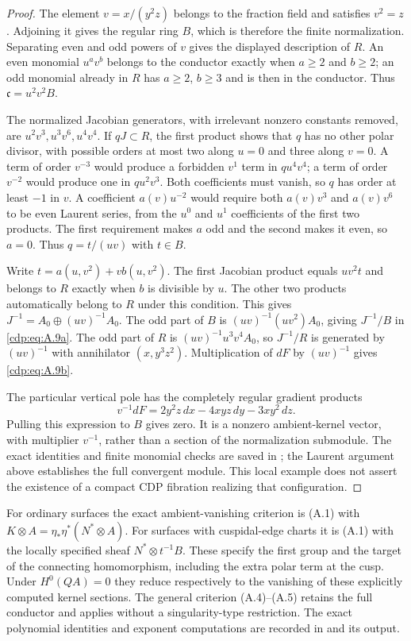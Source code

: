 \begin{proof}
The element $v=x/(y^2z)$ belongs to the fraction field and satisfies $v^2=z$. Adjoining it gives the regular ring $B$, which is therefore the finite normalization. Separating even and odd powers of $v$ gives the displayed description of $R$. An even monomial $u^av^b$ belongs to the conductor exactly when $a\ge2$ and $b\ge2$; an odd monomial already in $R$ has $a\ge2$, $b\ge3$ and is then in the conductor. Thus $\mathfrak c=u^2v^2B$.

The normalized Jacobian generators, with irrelevant nonzero constants removed, are $u^2v^3,u^3v^6,u^4v^4$. If $qJ\subset R$, the first product shows that $q$ has no other polar divisor, with possible orders at most two along $u=0$ and three along $v=0$. A term of order $v^{-3}$ would produce a forbidden $v^1$ term in $qu^4v^4$; a term of order $v^{-2}$ would produce one in $qu^2v^3$. Both coefficients must vanish, so $q$ has order at least $-1$ in $v$. A coefficient $a(v)u^{-2}$ would require both $a(v)v^3$ and $a(v)v^6$ to be even Laurent series, from the $u^0$ and $u^1$ coefficients of the first two products. The first requirement makes $a$ odd and the second makes it even, so $a=0$. Thus $q=t/(uv)$ with $t\in B$.

Write $t=a(u,v^2)+v b(u,v^2)$. The first Jacobian product equals $uv^2t$ and belongs to $R$ exactly when $b$ is divisible by $u$. The other two products automatically belong to $R$ under this condition. This gives $J^{-1}=A_0\oplus(uv)^{-1}A_0$. The odd part of $B$ is $(uv)^{-1}(uv^2)A_0$, giving $J^{-1}/B$ in \eqref{cdp:eq:A.9a}. The odd part of $R$ is $(uv)^{-1}u^3v^4A_0$, so $J^{-1}/R$ is generated by $(uv)^{-1}$ with annihilator $(x,y^3z^2)$. Multiplication of $dF$ by $(uv)^{-1}$ gives \eqref{cdp:eq:A.9b}.

The particular vertical pole has the completely regular gradient products
\[
 v^{-1}dF=2y^2z\,dx-4xyz\,dy-3xy^2\,dz.
\]
Pulling this expression to $B$ gives zero. It is a nonzero ambient-kernel vector, with multiplier $v^{-1}$, rather than a section of the normalization submodule. The exact identities and finite monomial checks are saved in ; the Laurent argument above establishes the full convergent module. This local example does not assert the existence of a compact CDP fibration realizing that configuration.
\end{proof}

For ordinary surfaces the exact ambient-vanishing criterion is (A.1) with $K\otimes A=\eta_*\eta^*(N^*\otimes A)$. For surfaces with cuspidal-edge charts it is (A.1) with the locally specified sheaf $N^*\otimes t^{-1}B$. These specify the first group and the target of the connecting homomorphism, including the extra polar term at the cusp. Under $H^0(QA)=0$ they reduce respectively to the vanishing of these explicitly computed kernel sections. The general criterion (A.4)--(A.5) retains the full conductor and applies without a singularity-type restriction. The exact polynomial identities and exponent computations are recorded in  and its output.


